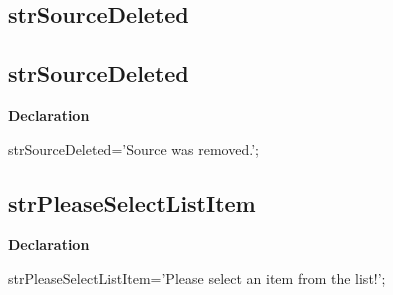\documentclass{report}
\newif\ifpdf
\begin{document}
\subsection*{\large{\textbf{strSourceDeleted}}\normalsize\hspace{1ex}\hrulefill}
\else
\subsection*{strSourceDeleted}
\fi
\label{trstrings-strSourceDeleted}
\begin{list}{}{
\setlength{\itemindent}{0cm}
\setlength{\listparindent}{0cm}
\setlength{\leftmargin}{\evensidemargin}
\addtolength{\leftmargin}{\tmplength}
\settowidth{\labelsep}{X}
\addtolength{\leftmargin}{\labelsep}
\setlength{\labelwidth}{\tmplength}
}
\item[\textbf{Declaration}\hfill]
\ifpdf
\begin{flushleft}
\fi
\begin{ttfamily}
strSourceDeleted='Source was removed.';\end{ttfamily}

\ifpdf
\end{flushleft}
\fi

\end{list}
\ifpdf
\subsection*{\large{\textbf{strPleaseSelectListItem}}\normalsize\hspace{1ex}\hrulefill}
\else
\subsection*{strPleaseSelectListItem}
\fi
\label{trstrings-strPleaseSelectListItem}
\begin{list}{}{
\setlength{\itemindent}{0cm}
\setlength{\listparindent}{0cm}
\setlength{\leftmargin}{\evensidemargin}
\addtolength{\leftmargin}{\tmplength}
\settowidth{\labelsep}{X}
\addtolength{\leftmargin}{\labelsep}
\setlength{\labelwidth}{\tmplength}
}
\item[\textbf{Declaration}\hfill]
\ifpdf
\begin{flushleft}
\fi
\begin{ttfamily}
strPleaseSelectListItem='Please select an item from the list!';\end{ttfamily}

\ifpdf
\end{flushleft}
\fi

\end{list}
\ifpdf
\end{document}
